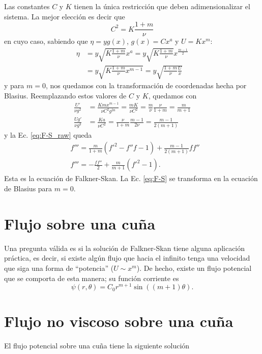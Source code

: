 Las constantes $C$ y $K$ tienen la única restricción que deben adimensionalizar el sistema.
La mejor elección es decir que 
%
\begin{equation}
C^2 = K\frac{1+m}{\nu}
\end{equation}
%
en cuyo caso, sabiendo que $\eta=yg(x)$, $g(x)=Cx^a$ y $U=Kx^m$:
%
\begin{align}\label{eq:eta_F-S}
\eta &= y\sqrt{K\frac{1+m}{\nu}}x^a = y\sqrt{K\frac{1+m}{\nu}}x^{\frac{m-1}{2}} \nonumber\\
&= y\sqrt{K\frac{1+m}{\nu}x^{m-1}} = y\sqrt{\frac{1+m}{\nu}\frac{U}{x}}
\end{align}
%
y para $m=0$, nos quedamos con la transformación de coordenadas hecha por Blasius.
Reemplazando estos valores de $C$ y $K$, quedamos con
%
\begin{align}
\frac{U'}{\nu g^2} &= \frac{Kmx^{m-1}}{\nu C^2g^{2a}} = \frac{mK}{\nu C^2} = \frac{m}{\nu}\frac{\nu}{1+m} = \frac{m}{m+1}\nonumber\\
\frac{Ug'}{\nu g^3} &= \frac{Ka}{\nu C^2} = \frac{\nu}{1+m}\frac{m-1}{2\nu} = \frac{m-1}{2(m+1)}
\end{align}
%
y la Ec. \eqref{eq:F-S_raw} queda
%
\begin{align}\label{eq:F-S}
&f''' = \frac{m}{1+m}(f'^2-f''f-1)+\frac{m-1}{2(m+1)}ff''\nonumber\\
&f''' = -\frac{ff''}{2} + \frac{m}{m+1}(f'^2-1).
\end{align}
%
Esta es la ecuación de Falkner-Skan.
La Ec. \eqref{eq:F-S} se transforma en la ecuación de Blasius para $m=0$. 

\section*{Flujo sobre una cuña}
Una pregunta válida es si la solución de Falkner-Skan tiene alguna aplicación práctica, es decir, si existe algún flujo que hacia el infinito tenga una velocidad que siga una forma de ``potencia'' ($U\sim x^m$).
De hecho, existe un flujo potencial que se comporta de esta manera; su función corriente es
%
\begin{equation}
\psi(r,\theta) = C_0 r^{m+1}\sin((m+1)\theta).
\end{equation}

\section*{Flujo no viscoso sobre una cuña}

El flujo potencial sobre una cuña tiene la siguiente solución

